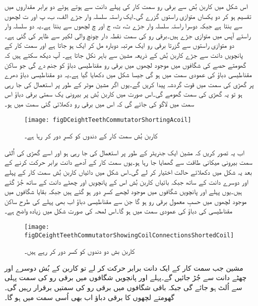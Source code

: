 اس شکل میں کاربن بُش سے برقی رو سمت کار کی پہلے دانت سے ہوتے ہوئے دو برابر مقداروں میں تقسیم ہو کر دو یکساں متوازی راستوں گزرے گی۔ایک راستہ سلسلہ وار جڑے الف، ب، پ اور ت لچھوں سے بنتا ہے جبکہ دوسرا راستہ سلسلہ وار جڑے ٹ، ث، ج اور چ لچھوں سے بنتا ہے۔یہ دو سلسلہ وار راستے آپس میں متوازی جڑے ہیں۔برقی رو کی سمت نقطہ دار چونچ والی لکیر سے ظاہر کی گئی ہے۔دو متوازی راستوں سے گزرتا برقی رو ایک مرتبہ دوبارہ مل کر ایک ہو جاتا ہے اور سمت کار کے پانچویں دانت سے جڑے کاربن بُش کے ذریعہ مشین سے باہر نکل جاتا ہے۔ آپ دیکھ سکتے ہیں کہ گھومتے حصے کی شگافوں میں موجود لچھوں میں برقی رو مقناطیسی دباؤ کو جنم دے گی جو ساکن مقناطیسی دباؤ کی عمودی سمت میں ہو گی جیسا شکل   میں دکھایا گیا ہے۔یہ دو مقناطیسی دباؤ دھرے پر گھڑی کی سمت میں قوت گردشہ پیدا کریں گے۔یوں اگر مشین موٹر کے طور پر استعمال کی جا رہی ہو تو یہ گھڑی کی سمت گھومے گی۔اس صورت میں کاربن بُش پر بیرونی یک سمتی برقی دباؤ اس سمت میں لاگو کی جائے گی کہ اس میں برقی رو دکھلائی گئی سمت میں ہو۔
\begin{figure}
\centering
\texttt{[image: figDCeightTeethCommutatorShortingAcoil]}
\caption{کاربن بُش سمت کار کے دندوں کو کسرِ دور کر رہا ہے۔}
\label{شکل_یکسمتی_سمتکار_کے_دندے_کسرے_دور}
\end{figure}

اب یہ تصور کریں کہ مشین ایک جنریٹر کے طور پر استعمال کی جا رہی ہو اور اسے گھڑی کی اُلٹی سمت بیرونی میکانی طاقت سے گھمایا جا رہا ہو۔یوں سمت کار کے آدھے دانت برابر حرکت کرنے کے بعد یہ شکل  میں دکھلائے حالت اختیار کر لے گی۔اس شکل میں دائیاں کاربن بُش سمت کار کے پہلے اور دوسرے دانت کے ساتھ جبکہ بائیاں کاربن بُش اس کے پانچویں اور چھٹے دانت کے ساتھ جُڑ گئے ہیں۔یوں پہلے اور پانچویں شگافوں میں موجود لچھے کسرِ دور ہو گئے ہیں جبکہ بقایا شگافوں میں موجود لچھوں میں حسبِ معمول برقی رو ہو گا جن سے مقناطیسی دباؤ اب بھی پہلے کی طرح ساکن مقناطیسی کی دباؤ کی عمودی سمت میں ہو گا۔اس لمحہ کی صورت شکل   میں زیادہ واضح ہے۔
\begin{figure}
\centering
\texttt{[image: figDCeightTeethCommutatorShowingCoilConnectionsShortedCoil]}
\caption{کاربن بش دو دندوں کو کسر دور کر رہے ہیں۔}
\label{شکل_یکسمتی_دندے_کسرے_دور}
\end{figure}

مشین جب سمت کار کے ایک دانت برابر حرکت کر لے تو کاربن کے بُش دوسرے اور چھٹے دانت سے جُڑ جائیں گے۔پہلے اور پانچویں شگافوں میں برقی رو کی سمت پہلی سے اُلٹ ہو جائے گی جبکہ باقی شگافوں میں برقی رو کی سمتیں برقرار رہیں گی۔گھومتے لچھوں کا برقی دباؤ اب بھی اُسی سمت میں ہو گا۔

